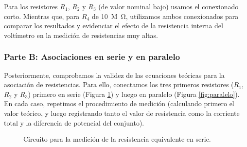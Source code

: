 \documentclass[11pt]{article}
\begin{document}
Para los resistores $R_1$, $R_2$ y $R_3$ (de valor nominal bajo) usamos el conexionado corto. Mientras que, para $R_4$ de \SI{10}{M\ohm}, utilizamos ambos conexionados para comparar los resultados y evidenciar el efecto de la resistencia interna del voltímetro en la medición de resistencias muy altas.

\subsubsection*{Parte B: Asociaciones en serie y en paralelo}
Posteriormente, comprobamos la validez de las ecuaciones teóricas para la asociación de resistencias. Para ello, conectamos los tres primeros resistores ($R_1$, $R_2$ y $R_3$) primero en serie (Figura \ref{fig:serie}) y luego en paralelo (Figura \ref{fig:paralelo}). En cada caso, repetimos el procedimiento de medición (calculando primero el valor teórico, y luego registrando tanto el valor de resistencia como la corriente total y la diferencia de potencial del conjunto).

\begin{figure}[H]
    \centering
    \caption{Circuito para la medición de la resistencia equivalente en serie.}
    \label{fig:serie}
\end{figure}
\end{document}
